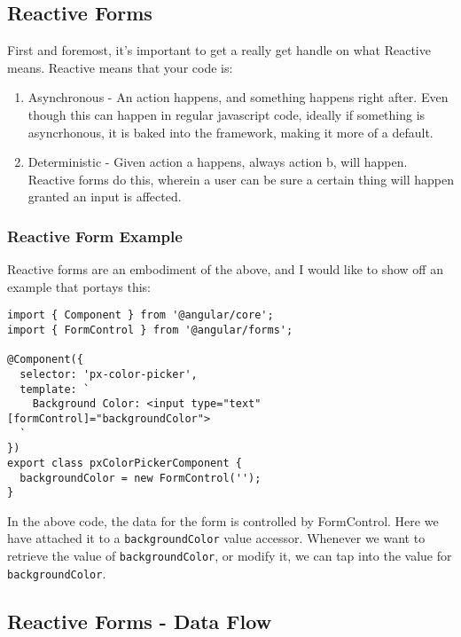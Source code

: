 \subsection{ Reactive Forms }
First and foremost, it's important to get a really get handle on what Reactive
means. Reactive means that your code is:
\begin{enumerate}
  \item Asynchronous - An action happens, and something happens right after. 
  Even though this can happen in regular javascript code, ideally if 
  something is asyncrhonous, it is baked into the framework, making it 
  more of a default.
  \item Deterministic -  Given action a happens, always action b, will 
  happen. Reactive forms do this, wherein a user can be sure a certain 
  thing will happen granted an input is affected.
\end{enumerate}

\subsubsection{ Reactive Form Example }
Reactive forms are an embodiment of the above, and I would like to show off an
example that portays this: 

\begin{lstlisting}
import { Component } from '@angular/core';
import { FormControl } from '@angular/forms';
  
@Component({
  selector: 'px-color-picker',
  template: `
    Background Color: <input type="text" [formControl]="backgroundColor">
  `
})
export class pxColorPickerComponent {
  backgroundColor = new FormControl('');
}
\end{lstlisting}

In the above code, the data for the form is controlled by FormControl. Here we
have attached it to a \lstinline{backgroundColor} value accessor. Whenever we 
want to retrieve the value of \lstinline{backgroundColor}, or modify it, we 
can tap into the value for \lstinline{backgroundColor}. 

\subsection{ Reactive Forms - Data Flow }

